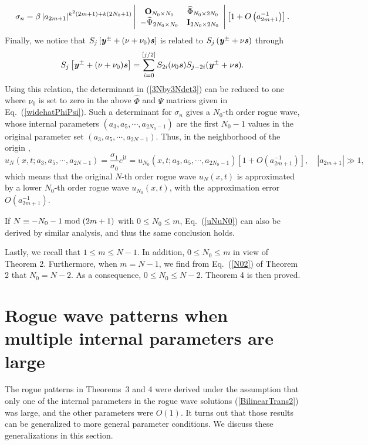 \documentclass[amsmath,amssymb]{revtex4}
\def\[{\begin{equation}}
\def\]{\end{equation}}
\begin{document}
\[ \label{3Nby3Ndet3}
\sigma_{n}=\beta \hspace{0.06cm} |a_{2m+1}|^{k^2(2m+1)+k(2N_0+1)}
\left|\begin{array}{cc}
\textbf{O}_{N_0\times N_0} & \widehat{\Phi}_{N_0\times 2N_0} \\
-\widehat{\Psi}_{2N_0\times N_0} & \textbf{I}_{2N_0\times 2N_0} \end{array}\right| \left[1+O\left(a_{2m+1}^{-1}\right)\right].
\]
Finally, we notice that $S_j\left[\textbf{\emph{y}}^{\pm} + (\nu+\nu_0) \textbf{\emph{s}}\right]$ is related to $S_j\left(\textbf{\emph{y}}^{\pm} + \nu \textbf{\emph{s}}\right)$ through
\begin{equation}
S_{j}\left[\textbf{\emph{y}}^{\pm} + (\nu+\nu_{0}) \textbf{\emph{s}}\right]=\sum_{i=0}^{\left[j/2\right]}S_{2i}(\nu_{0}\textbf{\emph{s}}) S_{j-2i}(\textbf{\emph{y}}^{\pm} +\nu\textbf{\emph{s}}).
\end{equation}
Using this relation, the determinant in (\ref{3Nby3Ndet3}) can be reduced to one where $\nu_0$ is set to zero in the above $\widehat{\Phi}$ and $\widehat{\Psi}$ matrices given in Eq.~(\ref{widehatPhiPsi}). Such a determinant for $\sigma_n$ gives a $N_0$-th order rogue wave, whose internal parameters $(a_3, a_5, \cdots, a_{2N_0-1})$ are the first $N_0-1$ values in the original parameter set $(a_3, a_5, \cdots, a_{2N-1})$. Thus, in the neighborhood of the origin ,
\[ \label{uNuN0}
u_N(x,t; a_3, a_5, \cdots, a_{2N-1}) = \frac{\sigma_{1}}{\sigma_{0}}e^{\textrm{i}t}= u_{N_{0}}(x,t; a_{3}, a_{5}, \cdots, a_{2N_{0}-1}) \left[1+O\left(a_{2m+1}^{-1}\right)\right], \quad |a_{2m+1}|\gg 1,
\]
which means that the original $N$-th order rogue wave $u_N(x,t)$ is approximated by a lower $N_0$-th order rogue wave $u_{N_0}(x,t)$, with the approximation error $O\left(a_{2m+1}^{-1}\right)$.

If $N\equiv -N_{0}-1 \hspace{0.1cm} \mbox{mod} \hspace{0.1cm} (2m+1)$ with $0\le N_0\le m$, Eq.~(\ref{uNuN0}) can also be derived by similar analysis, and thus the same conclusion holds.

Lastly, we recall that $1\le m\le N-1$. In addition, $0\le N_0\le m$ in view of Theorem 2. Furthermore, when $m=N-1$, we find from Eq.~(\ref{N02}) of Theorem 2 that $N_0=N-2$. As a consequence, $0\le N_0\le N-2$. Theorem 4 is then proved.

\section{Rogue wave patterns when multiple internal parameters are large} \label{sec:gen}
The rogue patterns in Theorems~3 and 4 were derived under the assumption that only one of the internal parameters in the rogue wave solutions (\ref{BilinearTrans2}) was large, and the other parameters were $O(1)$. It turns out that those results can be generalized to more general parameter conditions. We discuss these generalizations in this section.
\end{document}

